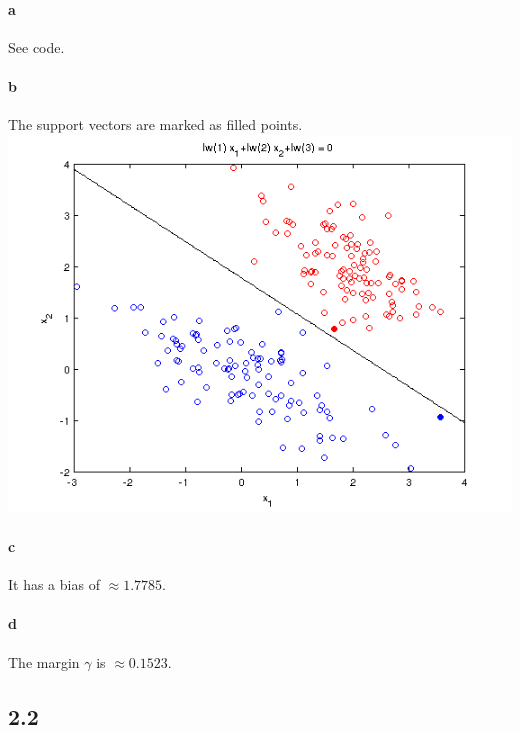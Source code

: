 \documentclass{article}
\begin{document}
\paragraph{a}
See code.

\paragraph{b}
The support vectors are marked as filled points. \\
\includegraphics[scale = 0.7]{pics/plot21.png}

\paragraph{c}
It has a bias of $\approx 1.7785$.

\paragraph{d}
The margin $\gamma$ is $\approx 0.1523$.

\subsection*{2.2}
\end{document}

